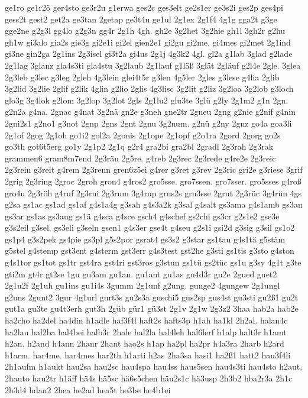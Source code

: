 {ge1ro
ge1r2ö
ger4sto
ge3r2u
g1erwa
ges2c
ges3elt
ge2s1er
ge3s2i
ges2p
ges4pi
gess2t
gest2
get2a
ge3tan
2getap
ge3t4u
ge1ul
2g1ex
2g1f4
4g1g
gga2t
g3ge
gge2ne
g2g3l
gg4lo
g2g3n
gg4r
2g1h
4gh.
gh2e
3g2het
3g2hie
gh1l
3gh2r
g2hu
gh1w
gi3alo
gia2s
gie3g
gi2e1i
gi2el
gien2e1
gi2gu
gi2me.
gi4mes
gi2met
2g1ind
gi3ne
gin2ga
2g1ins
2g3isel
gi3t2a
gi4us
2g1j
4g3k2
4gl.
gl2a
g1lab
3glad
g2lade
2g1lag
3glanz
gla4s3ti
gla4stu
3g2laub
2g1lauf
g1läß
3glät
2gläuf
g2l4e
2gle.
3glea
2g3leb
g3lec
g3leg
2gleh
4g3lein
glei4t5r
g3len
4g5ler
2gles
g3lese
g4lia
2glib
3g2lid
3g2lie
2glif
g2lik
4glin
g2lio
2glis
4g3lisc
3g2lit
g2liz
3g2loa
3g2lob
g3loch
glo3g
3g4lok
g2lom
3g2lop
3g2lot
2gls
2g1lu2
glu3te
3glü
g2ly
2g1m2
g1n
2gn.
g2n2a
g4na.
2gnac
g4nat
3g2nä
gn2e
g3neh
gne2tr
2gneu
2gng
g2nie
g2nif
g4nin
2gni2s1
g2no1
g3not
2gnp
2gns
2gnt
2gnu
3g2num.
g2nü
g2ny
2gnz
go4a
goa3li
2g1of
2gog
2g1oh
go1i2
gol2a
2gonis
2g1ope
2g1opf
g2o1ra
2gord
2gorg
go2s
go3th
got6t5erg
go1y
2g1p2
2g1q
g2r4
gra2bi
gra2bl
2gradl
2g3rah
2g3rak
grammen6
gram8m7end
2g3räu
2g5re.
g4reb
2g3rec
2g3rede
g4re2e
2g3reic
2g3rein
g3reit
g4rem
2g3renn
gren6z5ei
g4rer
g3ret
g3rev
2g3ric
gri2e
g3riese
3grif
2grig
2g3ring
2groc
2groh
gron4
g4ros2
gro5sse.
gro7ssen.
gro7sser.
gro5sses
g4roß
gro4u
2g3röh
g4ruf
2g3rui
2g3rum
3g4rup
grus2s
gru3sse
2grut
2g3rüc
3g4rün
4gs
g2sa
gs1ac
gs1ad
gs1af
g4s1a4g
g3sah
g4s3a2k
g3sal
g4salt
gs3ama
g4s1amb
gs3an
gs3ar
gs1as
gs3aug
gs1ä
g4sca
g4sce
gsch4
g4schef
gs2chi
gs3cr
g2s1e2
gse3e
g3s2eil
g3sel.
gs3eli
g3seln
gsen1
g4s3er
gse4t
g4seu
g2s1i
gsi2d
g3sig
g3sil
gs1o2
gs1p4
g3s2pek
gs4pie
gs3pl
g5s2por
gsrat4
gs3s2
g3star
gs1tau
g4s1tä
g5stäm
g5stel
g4stemp
gst3ent
g4sterm
gst3err
g4s3test
gst2he
g3sti
gs1tis
g3sto
g4ston
g4s1tor
gs1tot
gs1tr
gst4ra
gst4ri
gst3ros
g3stun
gs1tü
gs2tüc
gs1u
g3sy
4g1t
g3te
gti2m
gt4r
gt2se
1gu
gu3am
gu1an.
gu1ant
gu1as
gu4d3r
gu2e
2gued
guet2
2g1u2f
2g1uh
gu1ins
gu1i4s
3gumm
2g1unf
g2ung.
gunge2
4gungew
2g1ungl
g2uns
2gunt2
3gur
4g1url
gurt3s
gu2s3a
guschi5
gus2sp
gus4st
gu3sti
gu2ß1
gu2t
gut1a
gu3te
gu4t3erh
gut3h
2güb
gür1
gü3st
2g1v
2g1w
2g3z2
3haa
hab2a
hab2e
ha2cho
ha2del
ha4din
h1adle
haf3f4l
haft2s
hafts3p
h1ah
ha1kl
2h2al.
halan4c
ha2lau
hal2ba
hal4bei
halb3r
2hale
hal2la
hal4leh
hal6lerf
h1alp
halt3r
h1amt
h2an.
h2and
h4ann
2hanr
2hant
hao2s
h1ap
ha2pl
ha2pr
h4a3ra
2harb
h2ard
h1arm.
har4me.
har4mes
har2th
h1arti
h2as
2ha3sa
hasi1
ha2ß1
hatt2
hau3f4li
2h1aufm
h1aukt
hau2sa
hau2sc
hau4spa
hau4ss
haus5sen
hau4s3ti
hau4sto
h2aut.
2hauto
hau2tr
h1äff
hä4s
hä5sc
hä6s5chen
häu2s1c
hä3usp
2h3b2
hba2r3a
2h1c
2h3d4
hdan2
2hea
he2ad
hea5t
he3be
he4b1ei
}
